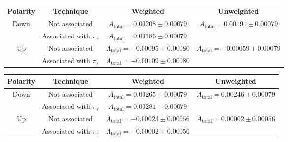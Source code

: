 \documentclass{article}
\begin{document}
        \begin{center}
                \begin{tabular}{c|c|c|c}
                        Polarity & Technique & Weighted & Unweighted\\
                        \hline\hline
                        \multirow{2}{*}{Down} & Not associated & $A_\text{total} = 0.00208\pm 0.00079$ & \multirow{2}{*}{$A_\text{total} = 0.00191\pm 0.00079$}\\
                        \cline{2-3}
                        & Associated with $\pi_s$ & $A_\text{total} = 0.00186\pm 0.00079$ & \\
                        \hline
                        \multirow{2}{*}{Up} & Not associated & $A_\text{total} = - 0.00095\pm 0.00080$ & \multirow{2}{*}{$A_\text{total} = - 0.00059 \pm 0.00079$}\\
                        \cline{2-3}
                        & Associated with $\pi_s$ & $A_\text{total} = - 0.00109\pm 0.00080$ & \\
                \end{tabular}
                \label{tab:2017}
        \end{center}
        \begin{center}
                \begin{tabular}{c|c|c|c}
                        Polarity & Technique & Weighted & Unweighted\\
                        \hline\hline
                        \multirow{2}{*}{Down} & Not associated & $A_\text{total} = 0.00265 \pm 0.00079$ & \multirow{2}{*}{$A_\text{total} = 0.00246 \pm 0.00079$}\\
                        \cline{2-3}
                        & Associated with $\pi_s$ & $A_\text{total} = 0.00281\pm 0.00079$ & \\
                        \hline
                        \multirow{2}{*}{Up} & Not associated & $A_\text{total} = - 0.00023\pm 0.00056$ & \multirow{2}{*}{$A_\text{total} = 0.00002\pm 0.00056$}\\
                        \cline{2-3}
                        & Associated with $\pi_s$ & $A_\text{total} = - 0.00002\pm 0.00056$ & \\
                \end{tabular}
                \label{tab:2018}
        \end{center}
\end{document}
